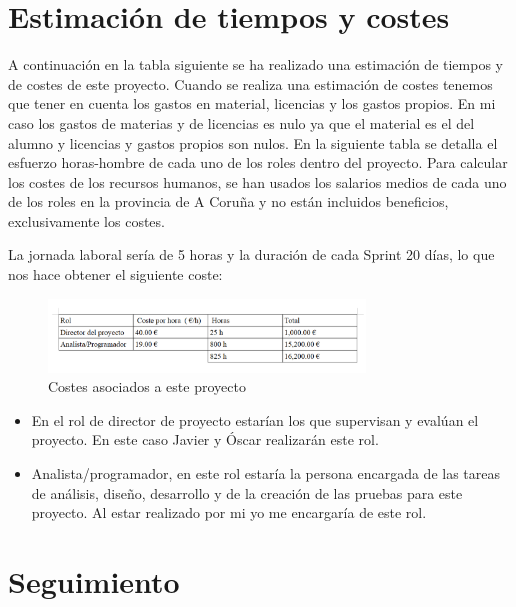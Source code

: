 \section{Estimación de tiempos y costes}
 A continuación en la tabla siguiente se ha realizado una estimación de tiempos y de costes de este proyecto.
 Cuando se realiza una estimación de costes tenemos que tener en cuenta los gastos en material, licencias y los gastos propios. En mi caso los gastos de materias y de licencias es nulo ya que el material es el del alumno y licencias y gastos propios son nulos.
 En la siguiente tabla se detalla el esfuerzo horas-hombre de cada uno de los roles dentro del proyecto. Para calcular los costes de los recursos humanos, se han usados los salarios medios de cada uno de los roles en la provincia de A Coruña y no están incluidos beneficios, exclusivamente los costes. 
 
 La jornada laboral sería de 5 horas y la duración de cada Sprint 20 días, lo que nos hace obtener el siguiente coste:


\begin{figure}[H]
		\centering
		\includegraphics[width=0.75\textwidth] {coste.png}
		\caption{Costes asociados a este proyecto }
	\end{figure}






\begin{itemize}
\item En el rol de director de proyecto estarían los que 
supervisan y evalúan el proyecto. En este caso Javier y Óscar realizarán este rol.

\item Analista/programador, en este rol estaría la persona encargada de las tareas de análisis, diseño, desarrollo y de la creación de las pruebas para este proyecto. Al estar realizado por mi yo me encargaría de este rol.





\end{itemize}
\section{Seguimiento}

